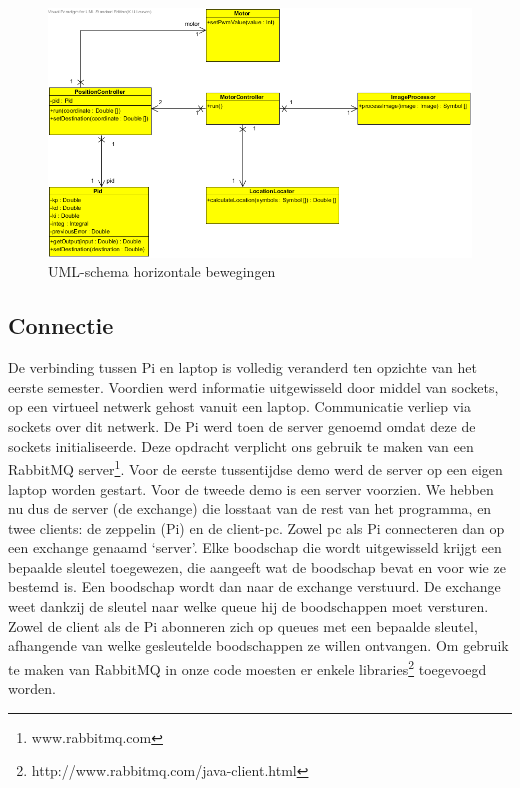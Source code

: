 \documentclass[eind]{penoverslag}
\begin{document}
\begin{figure}[H]
\begin{center}
\includegraphics[width=\textwidth]{XYNavigation.png}
\end{center}
\caption{UML-schema horizontale bewegingen}
\label{navigation}
\end{figure}

\subsection{Connectie}
De verbinding tussen Pi en laptop is volledig veranderd ten opzichte van het eerste semester. Voordien werd informatie uitgewisseld door middel van sockets, op een virtueel netwerk gehost vanuit een laptop. Communicatie verliep via sockets over dit netwerk. De Pi werd toen de server genoemd omdat deze de sockets initialiseerde. Deze opdracht verplicht ons gebruik te maken van een RabbitMQ server\footnote{www.rabbitmq.com}. Voor de eerste tussentijdse demo werd de server op een eigen laptop worden gestart. Voor de tweede demo is een server voorzien. We hebben nu dus de server (de exchange) die losstaat van de rest van het programma, en twee clients: de zeppelin (Pi) en de client-pc. Zowel pc als Pi connecteren dan op een exchange genaamd ‘server’. Elke boodschap die wordt uitgewisseld krijgt een bepaalde sleutel toegewezen, die aangeeft wat de boodschap bevat en voor wie ze bestemd is. Een boodschap wordt dan naar de exchange verstuurd. De exchange weet dankzij de sleutel naar welke queue hij de boodschappen moet versturen. Zowel de client als de Pi abonneren zich op queues met een bepaalde sleutel, afhangende van welke gesleutelde boodschappen ze willen ontvangen. Om gebruik te maken van RabbitMQ in onze code moesten er enkele libraries\footnote{http://www.rabbitmq.com/java-client.html} toegevoegd worden. \\
\end{document}
